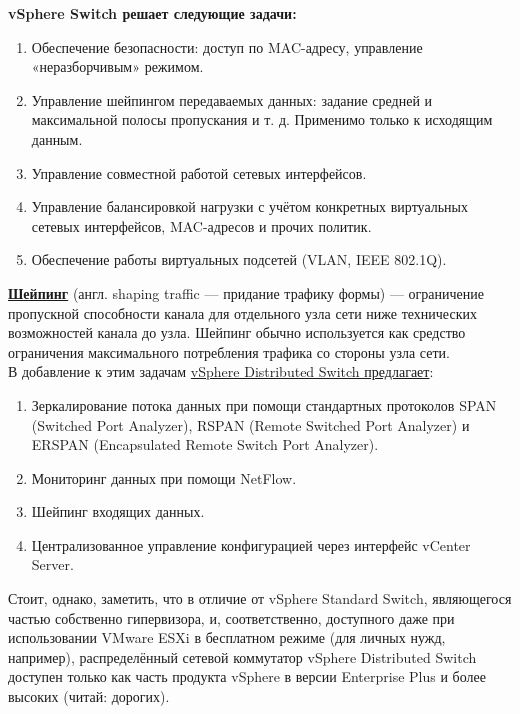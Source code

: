 \documentclass[14pt, a4paper]{article}
\begin{document}
\textbf{vSphere Switch решает следующие задачи:}
    \begin{enumerate}
        \item Обеспечение безопасности: доступ по MAC-адресу, управление «неразборчивым» режимом.
        \item Управление шейпингом передаваемых данных: задание средней и максимальной полосы
        пропускания и т. д. Применимо только к исходящим данным.
        \item Управление совместной работой сетевых интерфейсов.
        \item Управление балансировкой нагрузки с учётом конкретных виртуальных сетевых интерфейсов,
        MAC-адресов и прочих политик.
        \item Обеспечение работы виртуальных подсетей (VLAN, IEEE 802.1Q).
    \end{enumerate}

\href{https://ru.wikipedia.org/wiki/Шейпинг_(информатика)}{\textbf{Шейпинг}} (англ. shaping traffic — придание трафику формы) — ограничение пропускной способности
канала для отдельного узла сети ниже технических возможностей канала до узла. Шейпинг обычно
используется как средство ограничения максимального потребления трафика со стороны узла сети.\\

В добавление к этим задачам \href{https://kb.vmware.com/s/article/1010555}{vSphere Distributed Switch предлагает}:
\begin{enumerate}
    \item Зеркалирование потока данных при помощи стандартных протоколов SPAN (Switched Port
    Analyzer), RSPAN (Remote Switched Port Analyzer) и ERSPAN (Encapsulated Remote Switch Port
    Analyzer).
    \item Мониторинг данных при помощи NetFlow.
    \item Шейпинг входящих данных.
    \item Централизованное управление конфигурацией через интерфейс vCenter Server.
\end{enumerate}

Стоит, однако, заметить, что в отличие от vSphere Standard Switch, являющегося частью собственно
гипервизора, и, соответственно, доступного даже при использовании VMware ESXi в бесплатном
режиме (для личных нужд, например), распределённый сетевой коммутатор vSphere Distributed Switch
доступен только как часть продукта vSphere в версии Enterprise Plus и более высоких (читай: дорогих).
\end{document}

